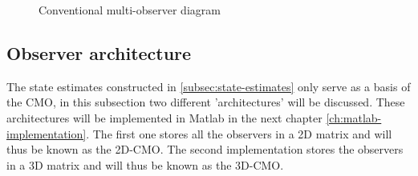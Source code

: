 \begin{figure}[h]
    \caption{Conventional multi-observer diagram}
    \label{fig:cmo-diagram}
\end{figure}

\subsection{Observer architecture}\label{subsec:CMO-architecture}
The state estimates constructed in \ref{subsec:state-estimates} only serve as a basis of the CMO, in this subsection two different 'architectures' will be discussed. These architectures will be implemented in Matlab in the next chapter \ref{ch:matlab-implementation}. The first one  stores all the observers in a 2D matrix and will thus be known as the 2D-CMO. The second implementation stores the observers in a 3D matrix and will thus be known as the 3D-CMO.

